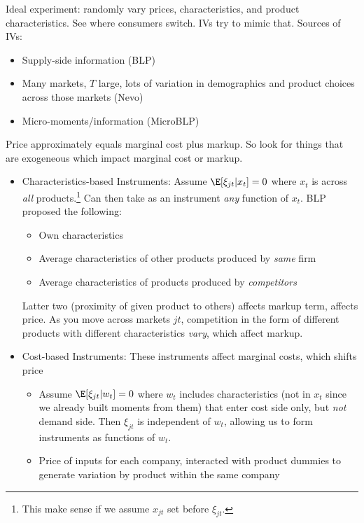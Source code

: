 \documentclass[12pt]{article}
\theoremstyle{plain}
\theoremstyle{definition}
\theoremstyle{remark}
\begin{document}
\clearpage
Ideal experiment: randomly vary prices, characteristics, and product
characteristics. See where consumers switch. IVs try to mimic that.
Sources of IVs:
\begin{itemize}
  \item Supply-side information (BLP)
  \item Many markets, $T$ large, lots of variation in demographics
    and product choices across those markets (Nevo)
  \item Micro-moments/information (MicroBLP)
\end{itemize}
Price approximately equals marginal cost plus markup.
So look for things that are exogeneous which impact marginal cost or
markup.
\begin{itemize}
  \item
    Characteristics-based Instruments:
    Assume $\E[\xi_{jt}|x_t]=0$ where $x_t$ is across
    \emph{all} products.\footnote{%
      This make sense if we assume $x_{jt}$ set before $\xi_{jt}$.
    }
    Can then take as an instrument \emph{any} function of $x_t$.
    BLP proposed the following:
    \begin{itemize}
      \item Own characteristics
      \item Average characteristics of other products produced by
        \emph{same} firm
      \item Average characteristics of products produced by
        \emph{competitors}
    \end{itemize}
    Latter two (proximity of given product to others) affects markup
    term, affects price.
    As you move across markets $jt$, competition in the form of
    different products with different characteristics \emph{vary}, which
    affect markup.

  \item Cost-based Instruments:
    These instruments affect marginal costs, which shifts price
    \begin{itemize}
      \item
        Assume $\E[\xi_{jt}|w_t]=0$ where $w_t$ includes characteristics
        (not in $x_t$ since we already built moments from them) that
        enter cost side only, but \emph{not} demand side.
        Then $\xi_{jt}$ is independent of $w_t$, allowing us to form
        instruments as functions of $w_t$.

      \item Price of inputs for each company, interacted with product
        dummies to generate variation by product within the same company


\end{itemize}
\end{itemize}
\end{document}

